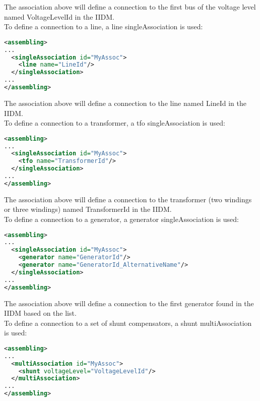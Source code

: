 \documentclass[a4paper, 12pt]{report}
\begin{document}
The association above will define a connection to the first bus of the voltage level named VoltageLevelId in the IIDM. \\

To define a connection to a line, a line singleAssociation is used:

 \begin{lstlisting}[language=XML, breaklines=true, breakatwhitespace=false, columns=fullflexible]
<assembling>
...
  <singleAssociation id="MyAssoc">
    <line name="LineId"/>
  </singleAssociation>
...
</assembling>
\end{lstlisting}

The association above will define a connection to the line named LineId in the IIDM. \\

To define a connection to a transformer, a tfo singleAssociation is used:

 \begin{lstlisting}[language=XML, breaklines=true, breakatwhitespace=false, columns=fullflexible]
<assembling>
...
  <singleAssociation id="MyAssoc">
    <tfo name="TransformerId"/>
  </singleAssociation>
...
</assembling>
\end{lstlisting}

The association above will define a connection to the transformer (two windings or three windings) named TransformerId in the IIDM. \\

To define a connection to a generator, a generator singleAssociation is used:

 \begin{lstlisting}[language=XML, breaklines=true, breakatwhitespace=false, columns=fullflexible]
<assembling>
...
  <singleAssociation id="MyAssoc">
    <generator name="GeneratorId"/>
    <generator name="GeneratorId_AlternativeName"/>
  </singleAssociation>
...
</assembling>
\end{lstlisting}

The association above will define a connection to the first generator found in the IIDM based on the list. \\

To define a connection to a set of shunt compensators, a shunt multiAssociation is used:

 \begin{lstlisting}[language=XML, breaklines=true, breakatwhitespace=false, columns=fullflexible]
<assembling>
...
  <multiAssociation id="MyAssoc">
    <shunt voltageLevel="VoltageLevelId"/>
  </multiAssociation>
...
</assembling>
\end{lstlisting}
\end{document}
